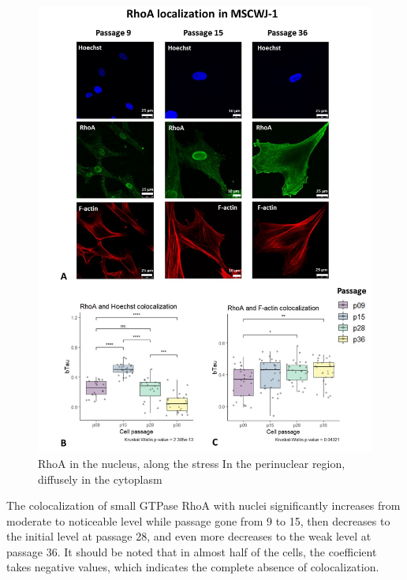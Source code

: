 \documentclass[english,authoryear]{elsarticle}
\begin{document}
\begin{figure}
  \includegraphics[width=0.9\linewidth]{fig_rho-actin-col.jpg}
  \caption{RhoA in the nucleus, along the stress In the perinuclear region, diffusely in the cytoplasm}
  \label{rho-actin-col}
  \centering
\end{figure}

The colocalization of small GTPase RhoA with nuclei significantly increases from moderate to noticeable level while passage gone from 9 to 15, then decreases to the initial level at passage 28, and even more decreases to the weak level at passage 36.
It should be noted that in almost half of the cells, the coefficient takes negative values, which indicates the complete absence of colocalization.
\end{document}
